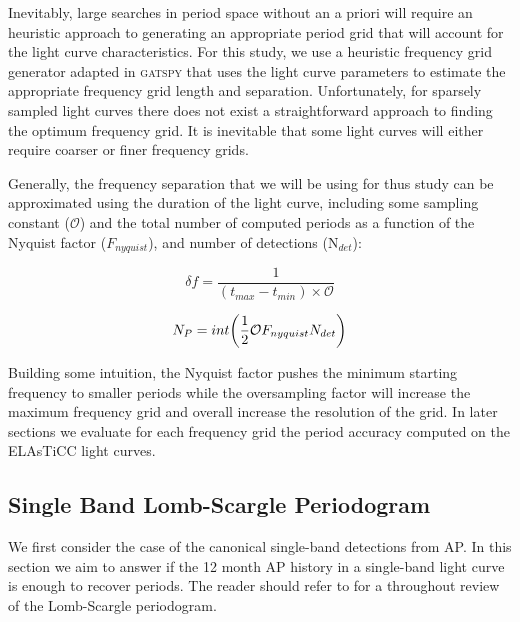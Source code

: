 \documentclass[DM,authoryear,toc]{lsstdoc}
\begin{document}
Inevitably, large searches in period space without an a priori will require an heuristic approach to generating an appropriate period grid that will account for the light curve characteristics.
For this study, we use a heuristic frequency grid generator adapted in \textsc{gatspy} that uses the light curve parameters to estimate the appropriate frequency grid length and separation.
Unfortunately, for sparsely sampled light curves there does not exist a straightforward approach to finding the optimum frequency grid.
It is inevitable that some light curves will either require coarser or finer frequency grids.

Generally, the frequency separation that we will be using for thus study can be approximated using the duration of the light curve, including some sampling constant ($\mathcal{O}$) and the total number of computed periods as a function of the Nyquist factor ($F_{nyquist}$), and number of detections (N$_{det}$): 

\begin{equation}
\delta f = \frac{1}{(t_{max} - t_{min}) \times \mathcal{O}}
\end{equation}

\begin{equation}
N_{P} = int \bigg{(} \frac{1}{2} \mathcal{O} F_{nyquist} N_{det} \bigg{)}
\end{equation}

Building some intuition, the Nyquist factor pushes the minimum starting frequency to smaller periods while the oversampling factor will increase the maximum frequency grid and overall increase the resolution of the grid.
In later sections we evaluate for each frequency grid the period accuracy computed on the ELAsTiCC light curves.


\subsection{Single Band Lomb-Scargle Periodogram}
We first consider the case of the canonical single-band detections from AP.
In this section we aim to answer  if the 12 month AP history in a single-band light curve is enough to recover periods.
The reader should refer to \citet{VanderPlas:VP2015} for a throughout review of the Lomb-Scargle periodogram.
  
\end{document}

